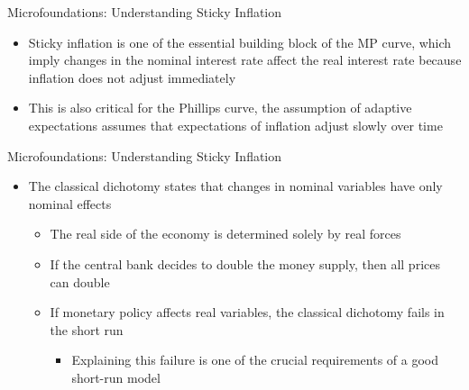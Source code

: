 \documentclass[aspectratio=1610]{beamer}
\begin{document}
%	

\begin{frame}[wide]{Microfoundations: Understanding Sticky Inflation}
	\begin{itemize}
		\item Sticky inflation is one of the essential building block of the MP curve, which imply changes in the nominal interest rate affect the real interest rate because inflation does not adjust immediately
		\vspace{5mm}
		\item This is also critical for the Phillips curve, the assumption of adaptive expectations assumes that expectations of inflation adjust slowly over time
	\end{itemize}
\end{frame}

\begin{frame}[wide]{Microfoundations: Understanding Sticky Inflation}
	\begin{itemize}
		\item The classical dichotomy states that changes in nominal variables have only nominal effects
		\vspace{2mm}
		\begin{itemize}
			\item The real side of the economy is determined solely by real forces
			\item If the central bank decides to double the money supply, then all prices can double 
			\item If monetary policy affects real variables, the classical dichotomy fails in the short run
			\begin{itemize}
				\item Explaining this failure is one of the crucial requirements of a good short-run model
			\end{itemize}
		\end{itemize}
	\end{itemize}
\end{frame}
\end{document}
